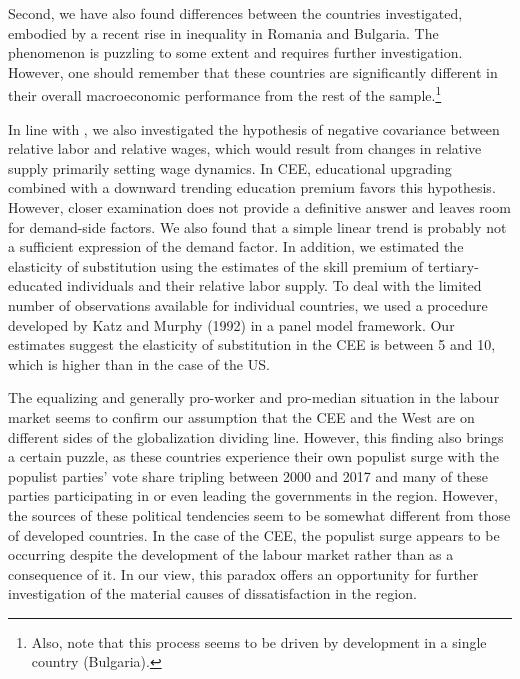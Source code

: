 \documentclass[11pt]{article}
\begin{document}
Second, we have also found differences between the countries investigated, embodied by a recent rise in inequality in Romania and Bulgaria. The phenomenon is puzzling to some extent and requires further investigation. However, one should remember that these countries are significantly different in their overall macroeconomic performance from the rest of the sample.\footnote{
Also, note that this process seems to be driven by development in a single country (Bulgaria).}

 In line with \citeauthor{katz1992changes}, we also investigated the hypothesis of negative covariance between relative labor and relative wages, which would result from changes in relative supply primarily setting wage dynamics. In CEE, educational upgrading combined with a downward trending education premium favors this hypothesis. However, closer examination does not provide a definitive answer and leaves room for demand-side factors. We also found that a simple linear trend is probably not a sufficient expression of the demand factor. In addition, we estimated the elasticity of substitution using the estimates of the skill premium of tertiary-educated individuals and their relative labor supply. To deal with the limited number of observations available for individual countries, we used a procedure developed by Katz and Murphy (1992) in a panel model framework. Our estimates suggest the elasticity of substitution in the CEE is between 5 and 10, which is higher than in the case of the US.


The equalizing and generally pro-worker and pro-median situation in the labour market seems to confirm our assumption that the CEE and the West are on different sides of the globalization dividing line. However, this finding also brings a certain puzzle, as these countries experience their own populist surge with the populist parties' vote share tripling between 2000 and 2017 and many of these parties participating in or even leading the governments in the region. However, the sources of these political tendencies seem to be somewhat different from those of developed countries. In the case of the CEE, the populist surge appears to be occurring despite the development of the labour market rather than as a consequence of it. In our view, this paradox offers an opportunity for further investigation of the material causes of dissatisfaction in the region.
\end{document}
